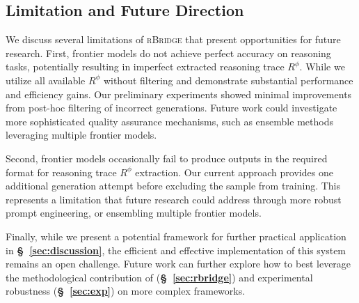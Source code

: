\subsection{Limitation and Future Direction} \label{app:limitation}

We discuss several limitations of \textsc{rBridge} that present opportunities for future research. First, frontier models do not achieve perfect accuracy on reasoning tasks, potentially resulting in imperfect extracted reasoning trace $R^\phi$. While we utilize all available $R^\phi$ without filtering and demonstrate substantial performance and efficiency gains. Our preliminary experiments showed minimal improvements from post-hoc filtering of incorrect generations. Future work could investigate more sophisticated quality assurance mechanisms, such as ensemble methods leveraging multiple frontier models.

Second, frontier models occasionally fail to produce outputs in the required format for reasoning trace $R^\phi$ extraction. Our current approach provides one additional generation attempt before excluding the sample from training. This represents a limitation that future research could address through more robust prompt engineering, or ensembling multiple frontier models.

Finally, while we present a potential framework for further practical application in \textbf{\S\ \ref{sec:discussion}}, the efficient and effective implementation of this system remains an open challenge. Future work can further explore how to best leverage the methodological contribution of  (\textbf{\S\ \ref{sec:rbridge}}) and experimental robustness (\textbf{\S\ \ref{sec:exp}}) on more complex frameworks.



